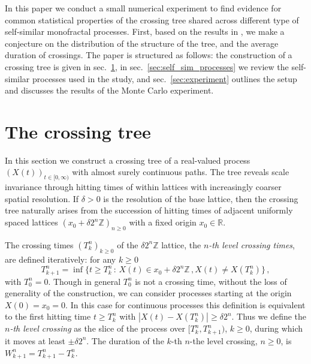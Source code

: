\documentclass[a4paper]{article}
\newcommand{\Real}{\mathbb{R}}
\begin{document}
In this paper we conduct a small numerical experiment to find evidence for common
statistical properties of the crossing tree shared across different type of self-similar
monofractal processes. First, based on the results in \cite{ECP1673}, we make a
conjecture on the distribution of the structure of the tree, and the average duration
of crossings. The paper is structured as follows: the construction of a crossing tree
is given in sec.~\ref{sec:the_crossing_tree}, in sec.~\ref{sec:self_sim_processes}
we review the self-similar processes used in the study, and sec.~\ref{sec:experiment}
outlines the setup and discusses the results of the Monte Carlo experiment.


\section{The crossing tree} %
\label{sec:the_crossing_tree}

In this section we construct a crossing tree of a real-valued process $(X(t))_{t\in[0, \infty)}$
with almost surely continuous paths. The tree reveals scale invariance through hitting
times of within lattices with increasingly coarser spatial resolution. If $\delta>0$
is the resolution of the base lattice, then the crossing tree naturally arises from
the succession of hitting times of adjacent uniformly spaced lattices $(x_0 + \delta 2^n \mathbb{Z})_{n\geq 0}$
with a fixed origin $x_0\in \Real$.

The crossing times $(T_k^n)_{k\geq0}$ of the $\delta 2^n \mathbb{Z}$ lattice, the
\emph{$n$-th level crossing times}, are defined iteratively: for any $k\geq 0$
\begin{equation} \label{eq:xing_time}
  T_{k+1}^n = \inf\bigl\{t\geq T_k^n\,:\,
        X(t)\in x_0 + \delta 2^n \mathbb{Z}\,, X(t)\neq X(T^n_k)
    \bigr\} \,,
\end{equation}
with $T_0^n = 0$. Though in general $T_0^n$ is not a crossing time, without the
loss of generality of the construction, we can consider processes starting at the
origin $X(0)=x_0=0$. In this case for continuous processes this definition is equivalent
to the first hitting time $t\geq T_k^n$ with $|X(t) - X(T^n_k)| \geq \delta 2^n$.
Thus we define the \emph{$n$-th level crossing} as the slice of the process over
$[T_k^n, T_{k+1}^n)$, $k\geq 0$, during which it moves at least $\pm \delta 2^n$.
The duration of the $k$-th $n$-the level crossing, $n\geq0$, is $W_{k+1}^n = T_{k+1}^n - T_k^n$.
\end{document}
